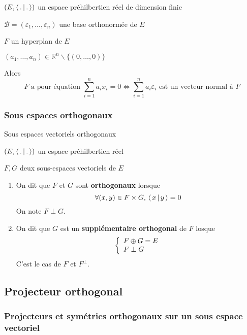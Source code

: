        \begin{prop}{}{}
            \begin{soient}
                \item $(E,\left<\,.\,\middle|\,.\,\right>)$ un espace préhilbertien réel de dimension finie
                \item $\mathcal{B} = (\varepsilon_1,\ldots,\varepsilon_n)$ une base orthonormée de $E$
                \item $F$ un hyperplan de $E$
                \item $(a_1,\ldots,a_n) \in \mathbb{R}^n \backslash \{(0,\ldots,0)\}$
            \end{soient}
            Alors
            \[ F \text{ a pour équation } \sum\limits_{i=1}^n a_i x_i = 0 \iff \sum\limits_{i=1}^n a_i \varepsilon_i \text{ est un vecteur normal à } F \] 
        \end{prop}

        \subsubsection{Sous espaces orthogonaux}

        \begin{defitheo}{Sous espaces vectoriels orthogonaux}{}
            \begin{soient}
                \item $(E,\left<\,.\,\middle|\,.\,\right>)$ un espace préhilbertien réel
                \item $F,G$ deux sous-espaces vectoriels de $E$
            \end{soient}
            \begin{enumerate}
                \item On dit que $F$ et $G$ sont \textbf{orthogonaux} lorsque \[ \forall (x,y) \in F \times G, \, \left<\,x\,\middle|\,y\,\right> = 0 \] 
                On note $F \perp G$.
                \item On dit que $G$ est un \textbf{supplémentaire orthogonal} de $F$ losque \[ \et{F \oplus G = E}{F \perp G} \]
                C’est le cas de $F$ et $F^{\perp}$.
            \end{enumerate}
        \end{defitheo}

    \subsection{Projecteur orthogonal}

        \subsubsection{Projecteurs et symétries orthogonaux sur un sous espace vectoriel}

